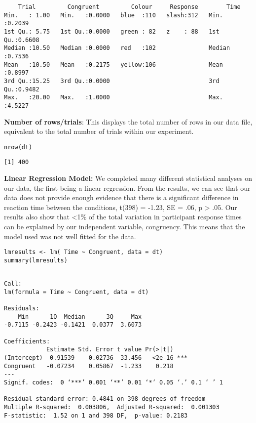 \documentclass{article}
\begin{document}
\begin{verbatim}
    Trial         Congruent         Colour     Response        Time       
Min.   : 1.00   Min.   :0.0000   blue  :110   slash:312   Min.   :0.2039  
1st Qu.: 5.75   1st Qu.:0.0000   green : 82   z    : 88   1st Qu.:0.6608  
Median :10.50   Median :0.0000   red   :102               Median :0.7536  
Mean   :10.50   Mean   :0.2175   yellow:106               Mean   :0.8997  
3rd Qu.:15.25   3rd Qu.:0.0000                            3rd Qu.:0.9482  
Max.   :20.00   Max.   :1.0000                            Max.   :4.5227
\end{verbatim}

\textbf{Number of rows/trials}: This displays the total number of rows in our data file, equivalent to the total number of trials within our experiment.
\begin{verbatim}
nrow(dt)
\end{verbatim}

\begin{verbatim}
[1] 400
\end{verbatim}


\vspace{2em} \textbf{Linear Regression Model:} We completed many different statistical analyses on our data, the first being a linear regression. From the results, we can see that our data does not provide enough evidence that there is a significant difference in reaction time between the conditions, t(398) = -1.23, SE = .06, p > .05. Our results also show that <1\% of the total variation in participant response times can be explained by our independent variable, congruency. This means that the model used was not well fitted for the data.
\begin{verbatim}
lmresults <- lm( Time ~ Congruent, data = dt)
summary(lmresults)
\end{verbatim}

\begin{verbatim}

Call:
lm(formula = Time ~ Congruent, data = dt)

Residuals:
    Min      1Q  Median      3Q     Max 
-0.7115 -0.2423 -0.1421  0.0377  3.6073 

Coefficients:
            Estimate Std. Error t value Pr(>|t|)    
(Intercept)  0.91539    0.02736  33.456   <2e-16 ***
Congruent   -0.07234    0.05867  -1.233    0.218    
---
Signif. codes:  0 ‘***’ 0.001 ‘**’ 0.01 ‘*’ 0.05 ‘.’ 0.1 ‘ ’ 1

Residual standard error: 0.4841 on 398 degrees of freedom
Multiple R-squared:  0.003806,	Adjusted R-squared:  0.001303 
F-statistic:  1.52 on 1 and 398 DF,  p-value: 0.2183
\end{verbatim}
\end{document}

